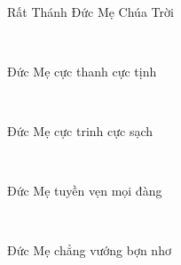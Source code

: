 \documentclass[12pt]{article}
\begin{document}
\begin{paracol}{2}
\begin{leftcolumn*}
\Large{\ \ \ \ \ }\\
\end{leftcolumn*}

\begin{rightcolumn}
Rất Thánh Đức Mẹ Chúa Trời\\
\end{rightcolumn}

\begin{leftcolumn*}
\Large{\ \ \ }\\
\end{leftcolumn*}

\begin{rightcolumn}
Đức Mẹ cực thanh cực tịnh\\
\end{rightcolumn}

\begin{leftcolumn*}
\Large{\ \ \ }\\
\end{leftcolumn*}

\begin{rightcolumn}
Đức Mẹ cực trinh cực sạch\\
\end{rightcolumn}

\begin{leftcolumn*}
\Large{\ \ \ }\\
\end{leftcolumn*}

\begin{rightcolumn}
Đức Mẹ tuyền vẹn mọi đàng\\
\end{rightcolumn}

\begin{leftcolumn*}
\Large{\ \ \ }\\
\end{leftcolumn*}

\begin{rightcolumn}
Đức Mẹ chẳng vướng bợn nhơ\\
\end{rightcolumn}

\begin{leftcolumn*}
\Large{\ \ \ }\\
\end{leftcolumn*}


\end{paracol}
\end{document}

